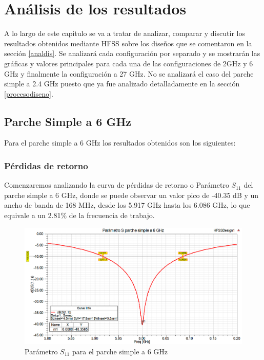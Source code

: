 \chapter{Análisis de los resultados}
\label{resultados}

A lo largo de este capitulo se va a tratar de analizar, comparar y discutir los resultados obtenidos mediante HFSS sobre los diseños que se comentaron en la sección \ref{analdis}. Se analizará cada configuración por separado y se mostrarán las gráficas y valores principales para cada una de las configuraciones de 2GHz y 6 GHz y finalmente la configuración a 27 GHz. No se analizará el caso del parche simple a 2.4 GHz puesto que ya fue analizado detalladamente en la sección \ref{procesodiseno}.

\section{Parche Simple a 6 GHz}
\par Para el parche simple a 6 GHz los resultados obtenidos son los siguientes:

\subsection{Pérdidas de retorno}
\par Comenzaremos analizando la curva de pérdidas de retorno o Parámetro $S_{11}$ del parche simple a 6 GHz, donde se puede observar un valor pico de -40.35 dB y un ancho de banda de 168 MHz, desde los 5.917 GHz hasta los 6.086 GHz, lo que equivale a un 2.81\% de la frecuencia de trabajo.
\\
\begin{figure}[H]
    \centering
        \includegraphics[width=\textwidth]{archivos/analisis/1x12/1}
        \caption{Parámetro $S_{11}$ para el parche simple a 6 GHz}
        \label{fig:s1x12}
\end{figure}

